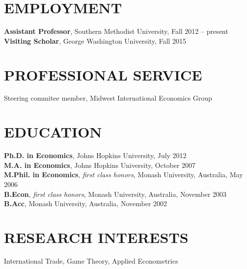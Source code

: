 \documentclass[11pt]{res}
\begin{document}
\begin{resume}
\hspace{-0.5in}\makebox[6.1in]{\hrulefill}

\section{EMPLOYMENT} \vspace{1.5mm}
{\bf Assistant Professor}, Southern Methodist University, Fall 2012 -- present\vspace{.5mm}\\
{\bf Visiting Scholar}, George Washington University, Fall 2015

\section{PROFESSIONAL SERVICE} \vspace{1.5mm}
Steering commitee member, Midwest International Economics Group

\section{EDUCATION} \vspace{1.5mm}
    {\bf Ph.D. in Economics}, Johns Hopkins University, July 2012 \vspace{.5mm}\\
    {\bf M.A. in Economics}, Johns Hopkins University, October 2007\vspace{1.5mm}\\
    {\bf M.Phil. in Economics}, \emph{first class honors}, Monash University, Australia, May 2006\vspace{1.5mm}\\
    {\bf B.Econ}, \emph{first class honors}, Monash University, Australia, November 2003\vspace{1.5mm}\\
    {\bf B.Acc}, Monash University, Australia, November 2002


\section{RESEARCH INTERESTS}\vspace{1.5mm}
International Trade, Game Theory, Applied Econometrics


\end{resume}
\end{document}
